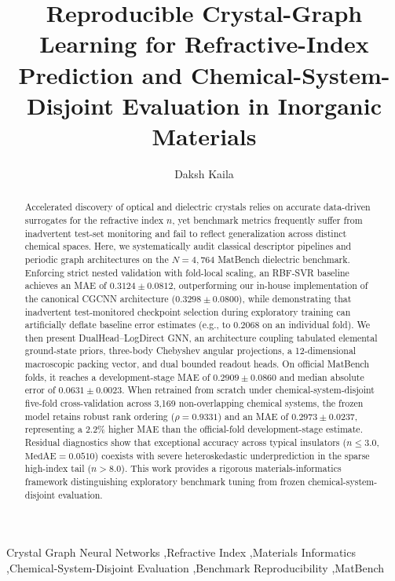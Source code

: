 \documentclass[final,3p,times]{elsarticle}
\begin{document}
\begin{frontmatter}

\title{Reproducible Crystal-Graph Learning for Refractive-Index Prediction and Chemical-System-Disjoint Evaluation in Inorganic Materials}

\author{Daksh Kaila}



\begin{abstract}
Accelerated discovery of optical and dielectric crystals relies on accurate data-driven surrogates for the refractive index $n$, yet benchmark metrics frequently suffer from inadvertent test-set monitoring and fail to reflect generalization across distinct chemical spaces. Here, we systematically audit classical descriptor pipelines and periodic graph architectures on the $N = 4{,}764$ MatBench dielectric benchmark. Enforcing strict nested validation with fold-local scaling, an RBF-SVR baseline achieves an MAE of $0.3124 \pm 0.0812$, outperforming our in-house implementation of the canonical CGCNN architecture ($0.3298 \pm 0.0800$), while demonstrating that inadvertent test-monitored checkpoint selection during exploratory training can artificially deflate baseline error estimates (e.g., to $0.2068$ on an individual fold). We then present DualHead--LogDirect GNN, an architecture coupling tabulated elemental ground-state priors, three-body Chebyshev angular projections, a 12-dimensional macroscopic packing vector, and dual bounded readout heads. On official MatBench folds, it reaches a development-stage MAE of $0.2909 \pm 0.0860$ and median absolute error of $0.0631 \pm 0.0023$. When retrained from scratch under chemical-system-disjoint five-fold cross-validation across 3,169 non-overlapping chemical systems, the frozen model retains robust rank ordering ($\rho = 0.9331$) and an MAE of $0.2973 \pm 0.0237$, representing a 2.2\% higher MAE than the official-fold development-stage estimate. Residual diagnostics show that exceptional accuracy across typical insulators ($n \le 3.0$, $\text{MedAE} = 0.0510$) coexists with severe heteroskedastic underprediction in the sparse high-index tail ($n > 8.0$). This work provides a rigorous materials-informatics framework distinguishing exploratory benchmark tuning from frozen chemical-system-disjoint evaluation.
\end{abstract}

\begin{keyword}
Crystal Graph Neural Networks \sep Refractive Index \sep Materials Informatics \sep Chemical-System-Disjoint Evaluation \sep Benchmark Reproducibility \sep MatBench
\end{keyword}

\end{frontmatter}
\end{document}
